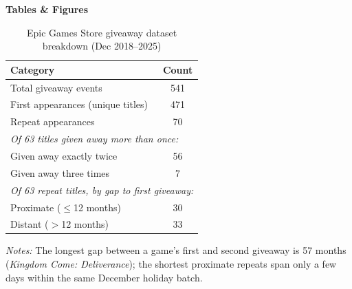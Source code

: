 \documentclass[11pt]{article}
\begin{document}
\begin{singlespace}

\begin{center}
{\large\bfseries Tables \& Figures}
\end{center}

\vspace{1em}

\begin{table}[H]
\centering\small
\caption{Epic Games Store giveaway dataset breakdown (Dec 2018--2025)}
\label{tab:epic_csv}
\begin{tabular}{lc}
\toprule
Category & Count \\
\midrule
Total giveaway events & 541 \\
\quad First appearances (unique titles) & 471 \\
\quad Repeat appearances & 70 \\
\midrule
\multicolumn{2}{l}{\textit{Of 63 titles given away more than once:}} \\
\quad Given away exactly twice & 56 \\
\quad Given away three times & 7 \\
\midrule
\multicolumn{2}{l}{\textit{Of 63 repeat titles, by gap to first giveaway:}} \\
\quad Proximate ($\leq$12 months) & 30 \\
\quad Distant ($>$12 months) & 33 \\
\bottomrule
\end{tabular}
\medskip

\noindent\small\textit{Notes:} The longest gap between a game's first and second
giveaway is 57 months (\textit{Kingdom Come: Deliverance}); the shortest
proximate repeats span only a few days within the same December holiday batch.
\end{table}

\vspace{2em}


\end{singlespace}
\end{document}
